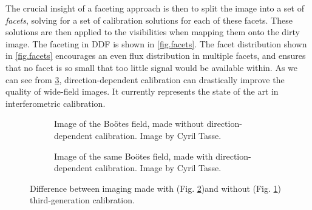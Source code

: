 \pg
The crucial insight of a faceting approach is then to split the image into a set of \emph{facets}, solving for a set of calibration solutions for each of these facets. These solutions are then applied to the visibilities when mapping them onto the dirty image. The faceting in DDF is shown in \cref{fig.facets}. The facet distribution shown in \cref{fig.facets} encourages an even flux distribution in multiple facets, and ensures that no facet is so small that too little signal would be available within. As we can see from \cref{fig.DDcal.effect}, direction-dependent calibration can drastically improve the quality of wide-field images. It currently represents the state of the art in interferometric calibration. 

\begin{figure}[h!]
\centering
\begin{subfigure}{\textwidth}
\caption{\label{fig.lofar.noDDcal} Image of the Boötes field, made without direction-dependent calibration. Image by Cyril Tasse.}
\end{subfigure}
\begin{subfigure}{\textwidth}
\caption{\label{fig.lofar.withDDcal} Image of the same Boötes field, made with direction-dependent calibration. Image by Cyril Tasse.}
\end{subfigure}
\caption{\label{fig.DDcal.effect} Difference between imaging made with (Fig. \ref{fig.lofar.withDDcal})and without (Fig. \ref{fig.lofar.noDDcal}) third-generation calibration.}
\end{figure}







